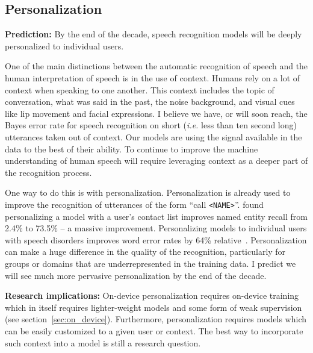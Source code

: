 \subsection{Personalization}

{\bf Prediction:} By the end of the decade, speech recognition models will be
deeply personalized to individual users.

One of the main distinctions between the automatic recognition of speech and
the human interpretation of speech is in the use of context. Humans rely on a
lot of context when speaking to one another. This context includes the topic
of conversation, what was said in the past, the noise background, and visual
cues like lip movement and facial expressions. I believe we have, or will soon
reach, the Bayes error rate for speech recognition on short (\emph{i.e.} less
than ten second long) utterances taken out of context. Our models are using the
signal available in the data to the best of their ability.  To continue to
improve the machine understanding of human speech will require leveraging
context as a deeper part of the recognition process.

One way to do this is with personalization. Personalization is already used to
improve the recognition of utterances of the form ``call \texttt{<NAME>}''.
\citet{sim2019personalization} found personalizing a model with a user's
contact list improves named entity recall from 2.4\% to 73.5\% -- a massive
improvement. Personalizing models to individual users with speech disorders
improves word error rates by 64\% relative~\citep{sim2019investigation}.
Personalization can make a huge difference in the quality of the
recognition, particularly for groups or domains that are underrepresented in
the training data. I predict we will see much more pervasive personalization by
the end of the decade.

{\bf Research implications:} On-device personalization requires on-device
training which in itself requires lighter-weight models and some form of weak
supervision (see section~\ref{sec:on_device}).  Furthermore, personalization
requires models which can be easily customized to a given user or context. The
best way to incorporate such context into a model is still a research question.
